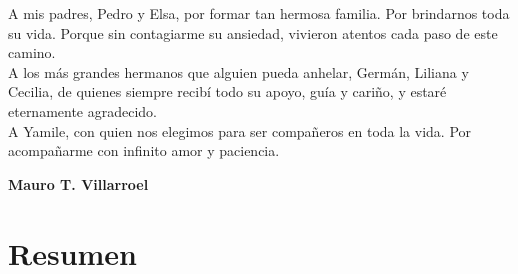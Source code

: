 \documentclass[a4paper,12pt]{report}
\begin{document}
\clearpage
A mis padres, Pedro y Elsa, por formar tan hermosa familia. Por brindarnos toda su vida. Porque sin contagiarme su ansiedad,
vivieron atentos cada paso de este camino.\\

A los más grandes hermanos que alguien pueda anhelar, Germán, Liliana y Cecilia, de quienes siempre recibí todo su apoyo, guía y
cariño, y estaré eternamente agradecido.\\

A Yamile, con quien nos elegimos para ser compañeros en toda la vida. Por acompañarme con infinito amor y paciencia.\\

\begin{flushright}
\textbf{Mauro T. Villarroel}
\end{flushright}

\thispagestyle{empty}
\newpage

\chapter*{Resumen}
\end{document}

